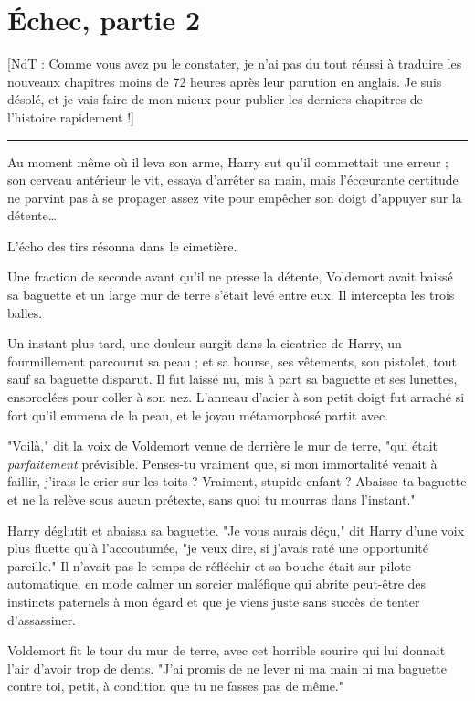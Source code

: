 
\chapter{Échec, partie 2}

[NdT : Comme vous avez pu le constater, je n'ai pas du tout réussi à traduire les nouveaux chapitres moins de 72 heures après leur parution en anglais. Je suis désolé, et je vais faire de mon mieux pour publier les derniers chapitres de l'histoire rapidement !]
\par\noindent\rule{\textwidth}{0.4pt}
Au moment même où il leva son arme, Harry sut qu'il commettait une erreur ; son cerveau antérieur le vit, essaya d'arrêter sa main, mais l'écœurante certitude ne parvint pas à se propager assez vite pour empêcher son doigt d'appuyer sur la détente…

L'écho des tirs résonna dans le cimetière.

Une fraction de seconde avant qu'il ne presse la détente, Voldemort avait baissé sa baguette et un large mur de terre s'était levé entre eux. Il intercepta les trois balles.

Un instant plus tard, une douleur surgit dans la cicatrice de Harry, un fourmillement parcourut sa peau ; et sa bourse, ses vêtements, son pistolet, tout sauf sa baguette disparut. Il fut laissé nu, mis à part sa baguette et ses lunettes, ensorcelées pour coller à son nez. L'anneau d'acier à son petit doigt fut arraché si fort qu'il emmena de la peau, et le joyau métamorphosé partit avec.

"Voilà," dit la voix de Voldemort venue de derrière le mur de terre, "qui était \emph{parfaitement}  prévisible. Penses-tu vraiment que, si mon immortalité venait à faillir, j'irais le crier sur les toits ? Vraiment, stupide enfant ? Abaisse ta baguette et ne la relève sous aucun prétexte, sans quoi tu mourras dans l'instant."

Harry déglutit et abaissa sa baguette. "Je vous aurais déçu," dit Harry d'une voix plus fluette qu'à l'accoutumée, "je veux dire, si j'avais raté une opportunité pareille." Il n'avait pas le temps de réfléchir et sa bouche était sur pilote automatique, en mode calmer un sorcier maléfique qui abrite peut-être des instincts paternels à mon égard et que je viens juste sans succès de tenter d'assassiner.

Voldemort fit le tour du mur de terre, avec cet horrible sourire qui lui donnait l'air d'avoir trop de dents. "J'ai promis de ne lever ni ma main ni ma baguette contre toi, petit, à condition que tu ne fasses pas de même."


